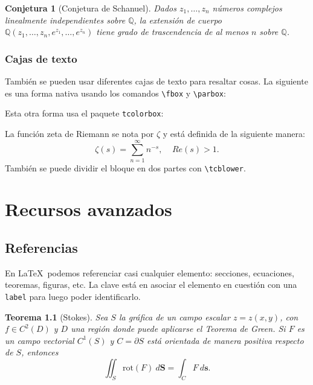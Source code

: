 \documentclass[12pt, spanish]{report}
\theoremstyle{definition} %
\theoremstyle{remark} %
\providecommand{\theoremname}{Teorema}
\theoremstyle{plain} %
\newtheorem{thm}[defn]{\protect\theoremname}
\theoremstyle{plain} %
\theoremstyle{plain} %
\theoremstyle{plain} %
\providecommand{\conjecturename}{Conjetura}
\theoremstyle{plain} %
\newtheorem*{conjecture}{\protect\conjecturename}
\theoremstyle{remark} %
\numberwithin{defn}{chapter}
\newcommand{\re}[1]{Re(#1)} %
\begin{document}
\begin{conjecture}[Conjetura de Schanuel]
    Dados $z_1, \dots, z_n$ números complejos linealmente independientes sobre $\mathbb{Q}$, la extensión de cuerpo $\mathbb{Q}(z_1, \dots, z_n, e^{z_1}, \dots, e^{z_n})$ tiene grado de trascendencia de al menos $n$ sobre $\mathbb{Q}$.
\end{conjecture}

\subsection{Cajas de texto}

También se pueden usar diferentes cajas de texto para resaltar cosas. La siguiente es una forma nativa usando los comandos \verb|\fbox| y \verb|\parbox|:

\begin{center}
    \noindent{}
\end{center}
Esta otra forma usa el paquete \verb|tcolorbox|:

\begin{tcolorbox}[
    colback=white, %
    colframe=teal, %
    title=Función zeta de Riemann %
]
La función zeta de Riemann se nota por $\zeta$ y está definida de la siguiente manera:
\[
    \zeta(s) = \sum_{n=1}^\infty n^{-s},\;\;\;\; \re{s}>1.
\]
\tcblower
También se puede dividir el bloque en dos partes con \verb|\tcblower|.
\end{tcolorbox}


\chapter{Recursos avanzados}

\section{Referencias}

En \LaTeX\ podemos referenciar casi cualquier elemento: secciones, ecuaciones, teoremas, figuras, etc. La clave está en asociar el elemento en cuestión con una \verb|label| para luego poder identificarlo.

\begin{thm}[Stokes]\label{teorema:stokes}
    Sea $S$ la gráfica de un campo escalar $z=z(x,y)$, con $f\in C^{2}(D)$ y $D$ una región donde puede aplicarse el Teorema de Green. Si $F$ es un campo vectorial $C^{1}(S)$ y $C=\partial S$ está orientada de manera positiva respecto de $S$, entonces 
    \begin{equation}\label{eq:formula stokes}
        \iint_{S}\text{rot}(F)\ d\boldsymbol{S}=\int_{C}F\ d\boldsymbol{s}.
    \end{equation}
\end{thm}
\end{document}
